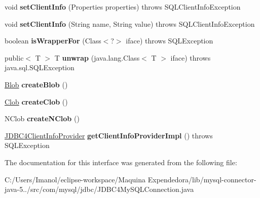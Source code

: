 \begin{DoxyCompactItemize}
void {\bfseries set\+Client\+Info} (Properties properties)  throws S\+Q\+L\+Client\+Info\+Exception
\item 
\mbox{\label{interfacecom_1_1mysql_1_1jdbc_1_1_j_d_b_c4_my_s_q_l_connection_a48cc569c868272fa62ab484127bcce63}} 
void {\bfseries set\+Client\+Info} (String name, String value)  throws S\+Q\+L\+Client\+Info\+Exception
\item 
\mbox{\label{interfacecom_1_1mysql_1_1jdbc_1_1_j_d_b_c4_my_s_q_l_connection_a22388e173cf4ffe62fec3546ebaaa0ba}} 
boolean {\bfseries is\+Wrapper\+For} (Class$<$?$>$ iface)  throws S\+Q\+L\+Exception
\item 
\mbox{\label{interfacecom_1_1mysql_1_1jdbc_1_1_j_d_b_c4_my_s_q_l_connection_ad526c6d0743e3d6d8d1d74022fb62f33}} 
public$<$ T $>$ T {\bfseries unwrap} (java.\+lang.\+Class$<$ T $>$ iface)  throws java.\+sql.\+S\+Q\+L\+Exception
\item 
\mbox{\label{interfacecom_1_1mysql_1_1jdbc_1_1_j_d_b_c4_my_s_q_l_connection_ad504396e584586647a4ddaeb716d114f}} 
\mbox{\hyperlink{classcom_1_1mysql_1_1jdbc_1_1_blob}{Blob}} {\bfseries create\+Blob} ()
\item 
\mbox{\label{interfacecom_1_1mysql_1_1jdbc_1_1_j_d_b_c4_my_s_q_l_connection_a2e0b12ecfac58db4548d6277d6983db5}} 
\mbox{\hyperlink{classcom_1_1mysql_1_1jdbc_1_1_clob}{Clob}} {\bfseries create\+Clob} ()
\item 
\mbox{\label{interfacecom_1_1mysql_1_1jdbc_1_1_j_d_b_c4_my_s_q_l_connection_afb24b977e0feb267ed5b20a3e38f764a}} 
N\+Clob {\bfseries create\+N\+Clob} ()
\item 
\mbox{\label{interfacecom_1_1mysql_1_1jdbc_1_1_j_d_b_c4_my_s_q_l_connection_a634bedb8c385760dbbbb4bc7d2ce2c6d}} 
\mbox{\hyperlink{interfacecom_1_1mysql_1_1jdbc_1_1_j_d_b_c4_client_info_provider}{J\+D\+B\+C4\+Client\+Info\+Provider}} {\bfseries get\+Client\+Info\+Provider\+Impl} ()  throws S\+Q\+L\+Exception
\end{DoxyCompactItemize}


The documentation for this interface was generated from the following file\+:\begin{DoxyCompactItemize}
\item 
C\+:/\+Users/\+Imanol/eclipse-\/workspace/\+Maquina Expendedora/lib/mysql-\/connector-\/java-\/5../src/com/mysql/jdbc/J\+D\+B\+C4\+My\+S\+Q\+L\+Connection.\+java\end{DoxyCompactItemize}
